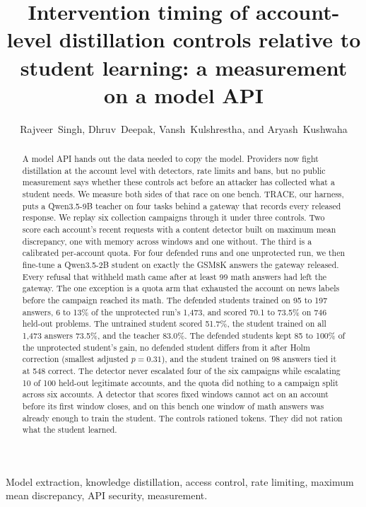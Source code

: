 \documentclass[journal]{IEEEtran}
\title{Intervention timing of account-level distillation controls relative to student learning: a measurement on a model API}
\author{Rajveer~Singh, Dhruv~Deepak, Vansh~Kulshrestha, and Aryash~Kushwaha}
\begin{document}
\maketitle

\begin{abstract}
A model API hands out the data needed to copy the model. Providers now fight distillation at the account level with detectors, rate limits and bans, but no public measurement says whether these controls act before an attacker has collected what a student needs. We measure both sides of that race on one bench. TRACE, our harness, puts a Qwen3.5-9B teacher on four tasks behind a gateway that records every released response. We replay six collection campaigns through it under three controls. Two score each account's recent requests with a content detector built on maximum mean discrepancy, one with memory across windows and one without. The third is a calibrated per-account quota. For four defended runs and one unprotected run, we then fine-tune a Qwen3.5-2B student on exactly the GSM8K answers the gateway released. Every refusal that withheld math came after at least 99 math answers had left the gateway. The one exception is a quota arm that exhausted the account on news labels before the campaign reached its math. The defended students trained on 95 to 197 answers, 6 to 13\% of the unprotected run's 1,473, and scored 70.1 to 73.5\% on 746 held-out problems. The untrained student scored 51.7\%, the student trained on all 1,473 answers 73.5\%, and the teacher 83.0\%. The defended students kept 85 to 100\% of the unprotected student's gain, no defended student differs from it after Holm correction (smallest adjusted $p=0.31$), and the student trained on 98 answers tied it at 548 correct. The detector never escalated four of the six campaigns while escalating 10 of 100 held-out legitimate accounts, and the quota did nothing to a campaign split across six accounts. A detector that scores fixed windows cannot act on an account before its first window closes, and on this bench one window of math answers was already enough to train the student. The controls rationed tokens. They did not ration what the student learned.
\end{abstract}
\begin{IEEEkeywords}
Model extraction, knowledge distillation, access control, rate limiting, maximum mean discrepancy, API security, measurement.
\end{IEEEkeywords}
\end{document}
